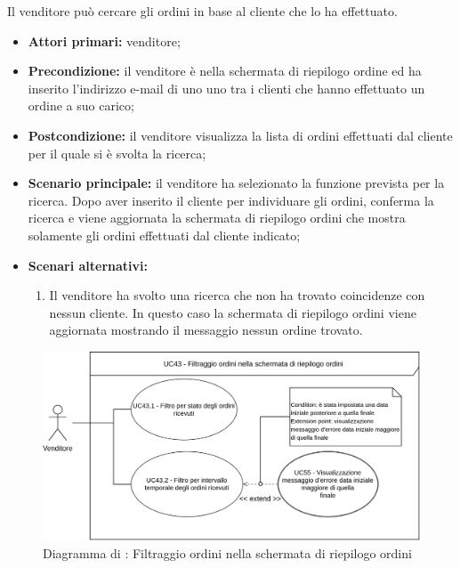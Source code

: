 \label{ricerca-cliente-ordine-venditore}

Il venditore può cercare gli ordini in base al cliente che lo ha effettuato.
\begin{itemize}
	\item \textbf{Attori primari:} venditore;
	\item \textbf{Precondizione:} il venditore è nella schermata di riepilogo ordine ed ha inserito l'indirizzo e-mail di uno uno tra i clienti che hanno effettuato un ordine a suo carico;
	\item \textbf{Postcondizione:} il venditore visualizza la lista di ordini effettuati dal cliente per il quale si è svolta la ricerca;
	\item \textbf{Scenario principale:} il venditore ha selezionato la funzione prevista per la ricerca. Dopo aver inserito il cliente per individuare gli ordini, conferma la ricerca e viene aggiornata la schermata di riepilogo ordini che mostra solamente gli ordini effettuati dal cliente indicato;
	\item \textbf{Scenari alternativi:}
	\begin{enumerate}[label=\lett]
		\item Il venditore ha svolto una ricerca che non ha trovato coincidenze con nessun cliente. In questo caso la schermata di riepilogo ordini viene aggiornata mostrando il messaggio nessun ordine trovato.
	\end{enumerate}
\end{itemize}

\label{filtro-ordini-venditore}

\begin{figure}[H]
    \centering
    \includegraphics[width=\textwidth]{Immagini/DiagrammiUC/Venditore/FiltraggioOrdiniVenditore.png}
    \caption{Diagramma di \actualUC: Filtraggio ordini nella schermata di riepilogo ordini}
    \label{fig:filtro-ordini-venditore}
\end{figure}

